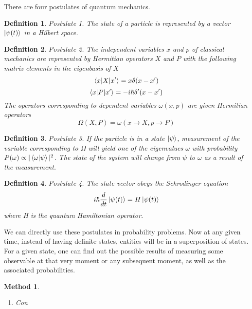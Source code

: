 \documentclass{tufte-book}
\newtheorem{definition}{Definition}
\newtheorem{method}{Method}
\begin{document}
There are four postulates of quantum mechanics.
\begin{definition}
	\label{def:17}
	Postulate 1. The state of a particle is represented by a vector $\ket{\psi(t)}$ in a Hilbert space.
\end{definition}
\begin{definition}
	\label{def:18}
	Postulate 2. The independent variables $x$ and $p$ of classical mechanics are represented by Hermitian operators $X$ and $P$ with the following matrix elements in the eigenbasis of $X$
	\[\braket{x|X|x'} = x\delta(x-x')\]
	\[\braket{x|P|x'} = -i\hbar\delta'(x-x')\]
	The operators corresponding to dependent variables $\omega(x, p)$ are given Hermitian operators
	\[\Omega(X, P) = \omega(x\rightarrow X, p\rightarrow P)\]
\end{definition}
\begin{definition}
	\label{def:19}
	Postulate 3. If the particle is in a state $\ket{\psi}$, measurement of the variable corresponding to $\Omega$ will yield one of the eigenvalues $\omega$ with probability $P(\omega)\propto|\braket{\omega|\psi}|^2$. The state of the system will change from $\psi$ to $\omega$ as a result of the measurement.
\end{definition}
\begin{definition}
	\label{def:20}
	Postulate 4. The state vector obeys the Schrodinger equation
	\[i\hbar\frac{d}{dt}\ket{\psi(t)} = H\ket{\psi(t)}\]
	where H is the quantum Hamiltonian operator.
\end{definition}

We can directly use these postulates in probability problems. Now at any given time, instead of having definite states, entities will be in a superposition of states. For a given state, one can find out the possible results of measuring some observable at that very moment or any subsequent moment, as well as the associated probabilities.

\begin{method}
	\label{meth:2}
	\begin{enumerate}
		\item Con
	\end{enumerate}
\end{method}


\backmatter





\printindex
\end{document}
